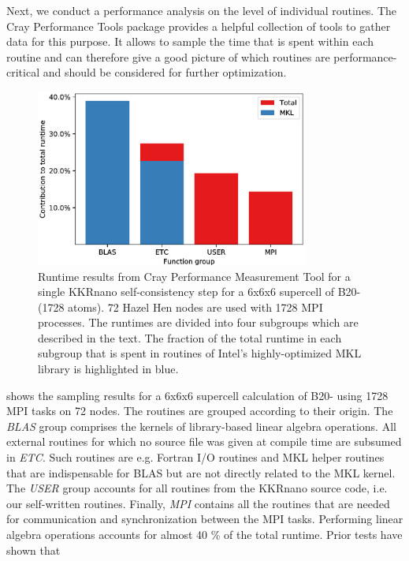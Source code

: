 \documentclass[graybox]{svmult}
\begin{document}
Next, we conduct a performance analysis on the level of individual routines.
The Cray Performance Tools package provides a helpful collection of tools to gather data for this purpose.
It allows to sample the time that is spent within each routine and can therefore give a good
picture of which routines are performance-critical and should be considered for further optimization.
\begin{figure}[htb]
\begin{center}
 \includegraphics[width=0.8\textwidth]{Figures/MnGe_6x6x6_crayreport.eps}
\end{center}
	\caption{Runtime results from Cray Performance Measurement 
	Tool for a single KKRnano self-consistency step 
	for a 6x6x6 supercell of B20- (1728 atoms). 72 Hazel Hen nodes are used with 1728 MPI processes.
	The runtimes are divided into four subgroups which are described in the text.
	The fraction of the total runtime in each subgroup that is spent in
	routines of Intel's highly-optimized MKL library is highlighted in blue.
	}
\label{fig:MnGe_6x6x6_crayreport}
\end{figure}
 shows the sampling results for a 6x6x6 supercell calculation
of B20- using 1728 MPI tasks on 72 nodes.
The routines are grouped according to their origin. The \textit{BLAS} group comprises the kernels of
library-based linear algebra operations. 
All external routines for which no source file was given at compile time are subsumed
in \textit{ETC}. Such routines are e.g. Fortran I/O routines and MKL helper routines
that are indispensable for BLAS but are not directly related
to the MKL kernel.
The \textit{USER} group accounts for all routines from the KKRnano source code, i.e. our self-written routines.
Finally, \textit{MPI} contains all the routines that are needed for communication and synchronization
between the MPI tasks. 
Performing linear algebra operations accounts for almost 40 \% of the total runtime. Prior tests have shown that
\end{document}
